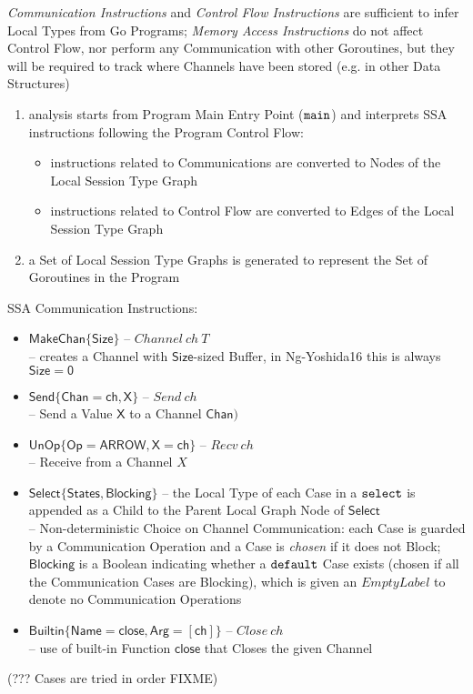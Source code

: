 \emph{Communication Instructions} and \emph{Control Flow Instructions}
are sufficient to infer Local Types from Go Programs; \emph{Memory
  Access Instructions} do not affect Control Flow, nor perform any
Communication with other Goroutines, but they will be required to
track where Channels have been stored (e.g. in other Data Structures)

\begin{enumerate}
  \item analysis starts from Program Main Entry Point ($\mathtt{main}$)
    and interprets SSA instructions following the Program Control
    Flow:
    \begin{itemize}
      \item instructions related to Communications are converted to
        Nodes of the Local Session Type Graph
      \item instructions related to Control Flow are converted to
        Edges of the Local Session Type Graph
    \end{itemize}
  \item a Set of Local Session Type Graphs is generated to represent
    the Set of Goroutines in the Program
\end{enumerate}

SSA Communication Instructions:
\begin{itemize}
  \item $\mathsf{MakeChan\{Size\}}$ -- $Channel\ ch\ T$ \\
    -- creates a Channel with $\mathsf{Size}$-sized Buffer, in
    Ng-Yoshida16 this is always $\mathsf{Size = 0}$
  \item $\mathsf{Send\{Chan=ch, X\}}$ -- $Send\ ch$ \\
    -- Send a Value $\mathsf{X}$ to a Channel $\mathsf{Chan})$
  \item $\mathsf{UnOp\{Op=ARROW, X=ch\}}$ -- $Recv\ ch$ \\
    -- Receive from a Channel $X$ %
  \item $\mathsf{Select\{States, Blocking\}}$ -- the Local Type of
    each Case in a $\mathtt{select}$ is appended as a Child to the
    Parent Local Graph Node of $\mathsf{Select}$ \\
    -- Non-deterministic Choice on Channel Communication: each Case is
    guarded by a Communication Operation and a Case is \emph{chosen}
    if it does not Block; $\mathsf{Blocking}$ is a Boolean indicating
    whether a $\mathtt{default}$ Case exists (chosen if all the
    Communication Cases are Blocking), which is given an $EmptyLabel$
    to denote no Communication Operations
  \item $\mathsf{Builtin\{Name=close, Arg=[ch]\}}$ -- $Close\ ch$ \\
    -- use of built-in Function $\mathsf{close}$ that Closes the given
    Channel
\end{itemize}
(??? Cases are tried in order FIXME)

